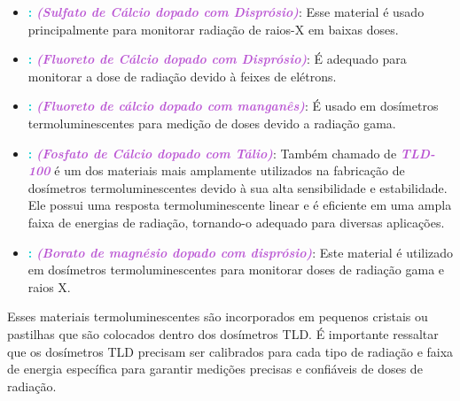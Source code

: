 \documentclass[11pt,a4paper]{article}
\begin{document}
\begin{tcolorbox}
\begin{itemize}[label=\textcolor{CarnationPink}{$\star$}]
			\item \textcolor{DarkTurquoise}{\textbf{:}} \textcolor{MediumOrchid}{\textit{\textbf{(Sulfato de Cálcio dopado com Disprósio)}}}: Esse material é usado principalmente para monitorar radiação de raios-X em baixas doses.			
			\item \textcolor{DarkTurquoise}{\textbf{:}} \textcolor{MediumOrchid}{\textit{\textbf{(Fluoreto de Cálcio dopado com Disprósio)}}}: É adequado para monitorar a dose de radiação devido à feixes de elétrons.			
			\item \textcolor{DarkTurquoise}{\textbf{:}} \textcolor{MediumOrchid}{\textit{\textbf{(Fluoreto de cálcio dopado com manganês)}}}: É usado em dosímetros termoluminescentes para medição de doses devido a radiação gama.			
			\item \textcolor{DarkTurquoise}{\textbf{:}} \textcolor{MediumOrchid}{\textit{\textbf{(Fosfato de Cálcio dopado com Tálio)}}}: Também chamado de \textcolor{MediumOrchid}{\textit{\textbf{TLD-100}}} é um dos materiais mais amplamente utilizados na fabricação de dosímetros termoluminescentes devido à sua alta sensibilidade e estabilidade. Ele possui uma resposta termoluminescente linear e é eficiente em uma ampla faixa de energias de radiação, tornando-o adequado para diversas aplicações.			
			\item \textcolor{DarkTurquoise}{\textbf{:}} \textcolor{MediumOrchid}{\textit{\textbf{(Borato de magnésio dopado com disprósio)}}}: Este material é utilizado em dosímetros termoluminescentes para monitorar doses de radiação gama e raios X.
		\end{itemize}
	\end{tcolorbox}

	Esses materiais termoluminescentes são incorporados em pequenos cristais ou pastilhas que são colocados dentro dos dosímetros TLD. É importante ressaltar que os dosímetros TLD precisam ser calibrados para cada tipo de radiação e faixa de energia específica para garantir medições precisas e confiáveis de doses de radiação.


\end{document}
